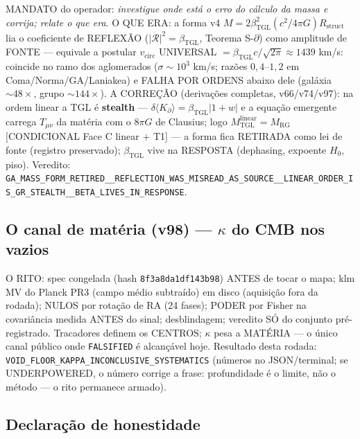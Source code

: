 \documentclass[11pt]{article}
\newcommand{\bTGL}{\beta_{\mathrm{TGL}}}\newcommand{\Msun}{M_{\odot}}\newcommand{\TGL}{\mathrm{TGL}}
\theoremstyle{definition}\newtheorem{deriv}{Derivação}
\begin{document}
MANDATO do operador: \emph{investigue onde está o erro do cálculo da massa e corrija; relate o que era}. O QUE ERA: a forma v4 $M=2\bTGL^2(c^2/4\pi G)R_{\mathrm{struct}}$ lia o coeficiente de REFLEXÃO ($|\mathcal R|^2=\bTGL$, Teorema S-$\partial$) como amplitude de FONTE --- equivale a postular $v_{\mathrm{circ}}$ UNIVERSAL $=\bTGL c/\sqrt{2\pi}\approx1439$ km/s: coincide no ramo dos aglomerados ($\sigma\sim10^3$ km/s; razões $0{,}4$--$1{,}2$ em Coma/Norma/GA/Laniakea) e FALHA POR ORDENS abaixo dele (galáxia $\sim48\times$, grupo $\sim144\times$). A CORREÇÃO (derivações completas, v66/v74/v97): na ordem linear a TGL é \textbf{stealth} --- $\delta\langle K_\partial\rangle=\bTGL|1+w|$ e a equação emergente carrega $T_{\mu\nu}$ da matéria com o $8\pi G$ de Clausius; logo $M_{\mathrm{TGL}}^{\mathrm{linear}}=M_{\mathrm{RG}}$ [CONDICIONAL Face C linear $+$ T1] --- a forma fica RETIRADA como lei de fonte (registro preservado); $\bTGL$ vive na RESPOSTA (dephasing, expoente $H_0$, piso). Veredito: \texttt{GA\_MASS\_FORM\_RETIRED\_\_REFLECTION\_WAS\_MISREAD\_AS\_SOURCE\_\_LINEAR\_ORDER\_IS\_GR\_STEALTH\_\_BETA\_LIVES\_IN\_RESPONSE}.

\subsection*{O canal de matéria (v98) --- $\kappa$ do CMB nos vazios}

O RITO: spec congelada (hash \texttt{8f3a8da1df143b98}) ANTES de tocar o mapa; klm MV do Planck PR3 (campo médio subtraído) em disco (aquisição fora da rodada); NULOS por rotação de RA (24 fases); PODER por Fisher na covariância medida ANTES do sinal; desblindagem; veredito SÓ do conjunto pré-registrado. Tracadores definem os CENTROS; $\kappa$ pesa a MATÉRIA --- o único canal público onde \texttt{FALSIFIED} é alcançável hoje. Resultado desta rodada: \texttt{VOID\_FLOOR\_KAPPA\_INCONCLUSIVE\_SYSTEMATICS} (números no JSON/terminal; se UNDERPOWERED, o número corrige a frase: profundidade é o limite, não o método --- o rito permanece armado).

\subsection*{Declaração de honestidade}
\end{document}
